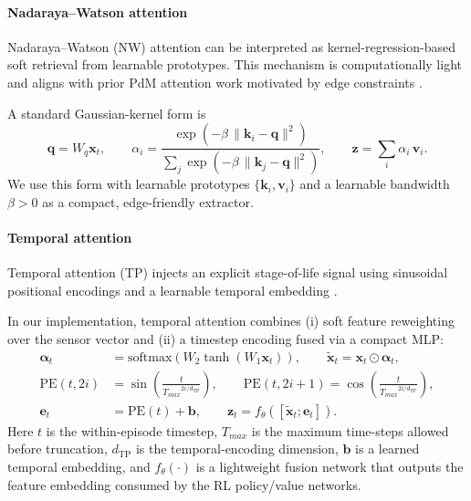 \documentclass[sn-vancouver-num]{sn-jnl}%
\begin{document}
\paragraph{Nadaraya--Watson attention}
Nadaraya--Watson (NW) attention can be interpreted as kernel-regression-based soft retrieval from learnable prototypes. This mechanism is computationally light and aligns with prior PdM attention work motivated by edge constraints \cite{Siraskar2024}.

A standard Gaussian-kernel form is
\begin{equation}
        \mathbf{q}=W_q\mathbf{x}_t,\qquad
        \alpha_i = \frac{\exp\left(-\beta\,\lVert \mathbf{k}_i-\mathbf{q}\rVert^2\right)}{\sum_j \exp\left(-\beta\,\lVert \mathbf{k}_j-\mathbf{q}\rVert^2\right)},
        \qquad \mathbf{z}=\sum_i\alpha_i\,\mathbf{v}_i.
\end{equation}
We use this form with learnable prototypes $\{\mathbf{k}_i,\mathbf{v}_i\}$ and a learnable bandwidth $\beta>0$ as a compact, edge-friendly extractor.

\paragraph{Temporal attention}
Temporal attention (TP) injects an explicit stage-of-life signal using sinusoidal positional encodings and a learnable temporal embedding \cite{Vaswani2017, Lim2020TFT}.

In our implementation, temporal attention combines (i) soft feature reweighting over the sensor vector and (ii) a timestep encoding fused via a compact MLP:
\begin{align}
        \boldsymbol{\alpha}_t &= \mathrm{softmax}\!\left(W_2\tanh\!\left(W_1\mathbf{x}_t\right)\right),
        \qquad \tilde{\mathbf{x}}_t = \mathbf{x}_t\odot\boldsymbol{\alpha}_t,\\
        \mathrm{PE}(t,2i) &= \sin\!\left(\frac{t}{{T_{max}}^{2i/d_{\mathrm{TP}}}}\right),
        \qquad \mathrm{PE}(t,2i+1)=\cos\!\left(\frac{t}{{T_{max}}^{2i/d_{\mathrm{TP}}}}\right),\\
        \mathbf{e}_t &= \mathrm{PE}(t) + \mathbf{b},
        \qquad \mathbf{z}_t = f_\theta\!\left([\tilde{\mathbf{x}}_t;\mathbf{e}_t]\right).
\end{align}
Here $t$ is the within-episode timestep, $T_{max}$ is the maximum time-steps allowed before truncation, $d_{\mathrm{TP}}$ is the temporal-encoding dimension, $\mathbf{b}$ is a learned temporal embedding, and $f_\theta(\cdot)$ is a lightweight fusion network that outputs the feature embedding consumed by the RL policy/value networks.
\end{document}
